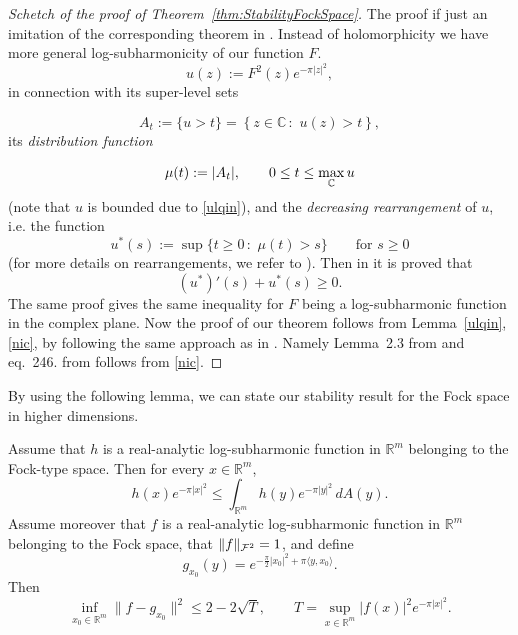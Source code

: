 \documentclass[a4paper,10pt]{amsart}
\newcommand{\Fock}{\mcalF^2}
\begin{document}
\begin{proof}[Schetch of the proof of Theorem~\ref{thm:StabilityFockSpace}]
The proof if just an imitation of the corresponding theorem in \cite{GomezGuerraRamosTilli2024}. Instead of holomorphicity we have more general log-subharmonicity of our function $F$.
\begin{equation}
\label{defu}
u(z):=F^2(z) e^{-\pi|z|^2},
\end{equation}
in connection with its super-level sets



\begin{equation}
\label{defAt}
A_t:=\{u>t\}=\left\{z\in\mathbb{C}\,:\,\, u(z)>t\right\},
\end{equation}
its \emph{distribution function}




\begin{equation}
\label{defmu}
\mu(t):= |A_t|,\qquad 0\leq t\leq \max_{\mathbb{C}} u
\end{equation}
(note that $u$ is bounded due to \eqref{ulqin}),
and the \emph{decreasing rearrangement} of $u$, i.e. the function
\begin{equation}
\label{defclassu*}
u^*(s):=\sup\{t\geq 0\,:\,\, \mu(t)>s\}\qquad \text{for $s\geq 0$}
\end{equation}
(for more details on rearrangements, we refer to  \cite{baernstein}).
Then in \cite{Nicola} it is proved that \begin{equation}\label{nic}(u^\ast)'(s)+u^\ast(s)\ge 0. \end{equation}
The same proof gives the same inequality for $F$ being a log-subharmonic function in the complex plane. Now the proof of our theorem follows from Lemma~\ref{ulqin}, \eqref{nic}, by following the same approach as in \cite{GomezGuerraRamosTilli2024}. Namely  Lemma~2.3 from  \cite{GomezGuerraRamosTilli2024} and  eq.~246. from \cite{GomezGuerraRamosTilli2024} follows from \eqref{nic}.

\end{proof}

By using the following lemma, we can state our stability result for the Fock space in higher dimensions.
\begin{numlemma}\label{ulqin2024}
Assume that \(h\) is a real-analytic log-subharmonic function in \(\mathbb{R}^m\) belonging to the Fock-type space. Then for every \(x\in \mathbb{R}^m\),
\begin{equation}\label{sharine1}
h(x)e^{-\pi |x|^2}\le  \int_{\mathbb{R}^m} h(y) e^{-\pi |y|^2}\, dA(y).
\end{equation}
Assume moreover that \(f\) is a real-analytic log-subharmonic function in \(\mathbb{R}^m\) belonging to the Fock space, that \(\|f\|_{\Fock}=1\), and define
\[
g_{x_0}(y)= e^{-\frac{\pi}{2} |x_0|^2+\pi \langle y,x_0\rangle}.
\]
Then
\begin{equation}\label{ulqin1}
\inf_{x_0\in \mathbb{R}^m}\|f-g_{x_0}\|^2\le 2-2 \sqrt{T},
\qquad
T=\sup_{x\in \mathbb{R}^m} |f(x)|^2e^{-\pi |x|^2}.
\end{equation}
\end{numlemma}
\end{document}
